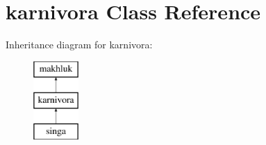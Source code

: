 \hypertarget{classkarnivora}{}\section{karnivora Class Reference}
\label{classkarnivora}
Inheritance diagram for karnivora\+:\begin{figure}[H]
\begin{center}
\leavevmode
\includegraphics[height=3.000000cm]{classkarnivora}
\end{center}
\end{figure}
